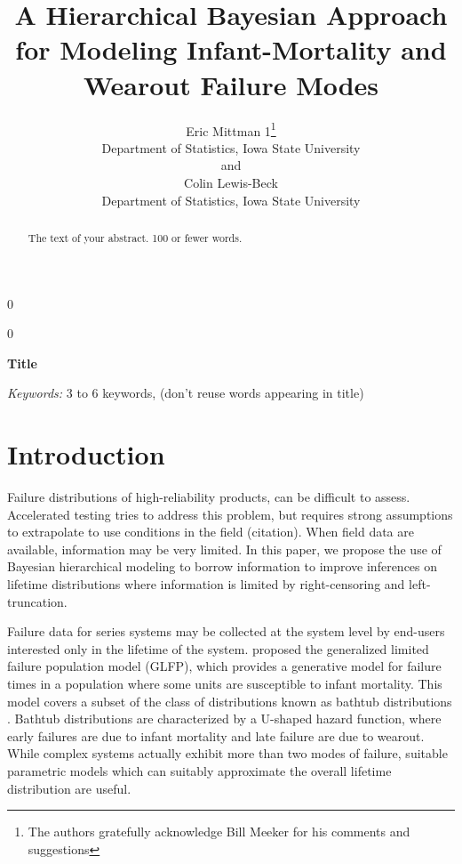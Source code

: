 \documentclass[12pt]{article}
\newcommand{\blind}{0}
\begin{document}
%

\def\spacingset#1{\renewcommand{\baselinestretch}%
{#1}\small\normalsize} \spacingset{1}



\blind
{
  \title{\bf A Hierarchical Bayesian Approach for Modeling Infant-Mortality and Wearout Failure Modes}
  \author{Eric Mittman 1\thanks{
    The authors gratefully acknowledge Bill Meeker for his comments and suggestions}\hspace{.2cm}\\
    Department of Statistics, Iowa State University\\
    and \\
    Colin Lewis-Beck \\
    Department of Statistics, Iowa State University}
  \maketitle
} \fi

\blind
{
  \bigskip
  \bigskip
  \bigskip
  \begin{center}
    {\LARGE\bf Title}
\end{center}
  \medskip
} \fi

\bigskip
\begin{abstract}
The text of your abstract.  100 or fewer words.
\end{abstract}

\noindent%
{\it Keywords:}  3 to 6 keywords, (don't reuse words appearing in title)
\vfill

\newpage
\spacingset{1.45} %
\section{Introduction}
Failure distributions of high-reliability products, can be difficult
to assess. Accelerated testing tries to address this problem, but
requires strong assumptions to extrapolate to use conditions in the
field (citation). When field data are available, information may be
very limited. In this paper, we propose the use of Bayesian hierarchical modeling to borrow
information to improve inferences on lifetime
distributions where information is limited by right-censoring and
left-truncation.

Failure data for series systems may be collected at the system level
by end-users interested only in the lifetime of the system. \citet{chan} proposed the generalized limited failure population
model (GLFP), which provides a generative model for
failure times in a population where some units are susceptible to infant mortality. This model
covers a subset of the class of distributions known as bathtub distributions
\cite{sujata}. Bathtub distributions are characterized by a U-shaped
hazard function, where early failures are due to infant mortality and
late failure are due to wearout. While complex systems actually
exhibit more than two modes of failure, suitable parametric models
which can suitably approximate the overall lifetime distribution are
useful. 
\end{document}
